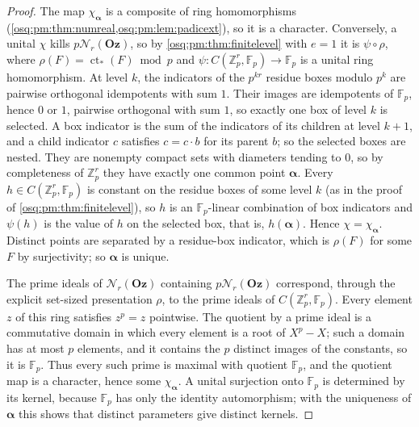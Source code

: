 \documentclass[11pt,letterpaper]{article}
\numberwithin{equation}{section}
\theoremstyle{definition}
\theoremstyle{remark}
\theoremstyle{plain}
\newcommand{\Oz}{\mathbf{Oz}}
\newcommand{\Z}{\mathbb Z}
\newcommand{\F}{\mathbb F}
\newcommand{\ct}{\operatorname{ct}}
\newcommand{\Num}{\mathscr N}
\begin{document}
\begin{proof}
The map $\chi_{\boldsymbol\alpha}$ is a composite of ring homomorphisms
(\cref{osq:pm:thm:numreal,osq:pm:lem:padicext}), so it is a character. Conversely, a
unital $\chi$ kills $p\Num_r(\Oz)$, so by \cref{osq:pm:thm:finitelevel} with $e=1$ it is
$\psi\circ\rho$, where $\rho(F)=\ct_*(F)\bmod p$ and $\psi:C(\Z_p^r,\F_p)\to\F_p$ is a
unital ring homomorphism. At level $k$, the indicators of the $p^{kr}$ residue boxes modulo
$p^k$ are pairwise orthogonal idempotents with sum $1$. Their images are idempotents of
$\F_p$, hence $0$ or $1$, pairwise orthogonal with sum $1$, so exactly one box of level
$k$ is selected. A box indicator is the sum of the indicators of its children at level
$k+1$, and a child indicator $c$ satisfies $c=c\cdot b$ for its parent $b$; so the
selected boxes are nested. They are nonempty compact sets with diameters tending to $0$,
so by completeness of $\Z_p^r$ they have exactly one common point $\boldsymbol\alpha$.
Every $h\in C(\Z_p^r,\F_p)$ is constant on the residue boxes of some level $k$
(as in the proof of \cref{osq:pm:thm:finitelevel}), so $h$ is an $\F_p$-linear
combination of box indicators and $\psi(h)$ is the value of $h$ on the selected box, that
is, $h(\boldsymbol\alpha)$. Hence $\chi=\chi_{\boldsymbol\alpha}$. Distinct points are
separated by a residue-box indicator, which is $\rho(F)$ for some $F$ by surjectivity; so
$\boldsymbol\alpha$ is unique.

The prime ideals of $\Num_r(\Oz)$ containing $p\Num_r(\Oz)$ correspond, through the
explicit set-sized presentation $\rho$, to the prime ideals of $C(\Z_p^r,\F_p)$. Every
element $z$ of this ring satisfies $z^p=z$ pointwise. The quotient by a prime ideal is a
commutative domain in which every element is a root of $X^p-X$; such a domain has at most
$p$ elements, and it contains the $p$ distinct images of the constants, so it is $\F_p$.
Thus every such prime is maximal with quotient $\F_p$, and the quotient map is a character,
hence some $\chi_{\boldsymbol\alpha}$. A unital surjection onto $\F_p$ is determined by its
kernel, because $\F_p$ has only the identity automorphism; with the uniqueness of
$\boldsymbol\alpha$ this shows that distinct parameters give distinct kernels.
\end{proof}
\end{document}
